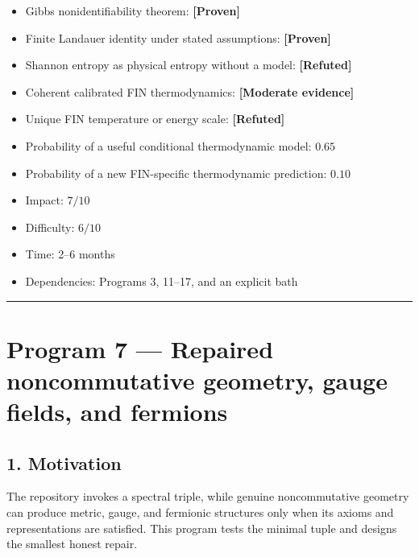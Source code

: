 \documentclass[11pt,a4paper,openany]{report}
\newcommand{\statusProven}{\textcolor{fingreen}{[Proven]}}
\newcommand{\statusModerate}{\textcolor{finviolet}{[Moderate evidence]}}
\newcommand{\statusRefuted}{\textcolor{finred}{[Refuted]}}
\begin{document}
\begin{itemize}
\item 
Gibbs nonidentifiability theorem: \textbf{\statusProven{}}

\item 
Finite Landauer identity under stated assumptions: \textbf{\statusProven{}}

\item 
Shannon entropy as physical entropy without a model: \textbf{\statusRefuted{}}

\item 
Coherent calibrated FIN thermodynamics: \textbf{\statusModerate{}}

\item 
Unique FIN temperature or energy scale: \textbf{\statusRefuted{}}

\item 
Probability of a useful conditional thermodynamic model: \(0.65\)

\item 
Probability of a new FIN-specific thermodynamic prediction: \(0.10\)

\item 
Impact: \(7/10\)

\item 
Difficulty: \(6/10\)

\item 
Time: 2–6 months

\item 
Dependencies: Programs 3, 11–17, and an explicit bath

\end{itemize}

\par\medskip\hrule\medskip

\chapter{Program 7 — Repaired noncommutative geometry, gauge fields, and fermions}

\section{1. Motivation}

The repository invokes a spectral triple, while genuine noncommutative geometry can produce metric, gauge, and fermionic structures only when its axioms and representations are satisfied. This program tests the minimal tuple and designs the smallest honest repair.
\end{document}
